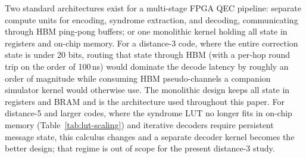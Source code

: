 Two standard architectures exist for a multi-stage FPGA QEC pipeline: separate compute units for encoding, syndrome extraction, and decoding, communicating through HBM ping-pong buffers; or one monolithic kernel holding all state in registers and on-chip memory. For a distance-3 code, where the entire correction state is under 20 bits, routing that state through HBM (with a per-hop round trip on the order of 100\,ns) would dominate the decode latency by roughly an order of magnitude while consuming HBM pseudo-channels a companion simulator kernel would otherwise use. The monolithic design keeps all state in registers and BRAM and is the architecture used throughout this paper. For distance-5 and larger codes, where the syndrome LUT no longer fits in on-chip memory (Table~\ref{tab:lut-scaling}) and iterative decoders require persistent message state, this calculus changes and a separate decoder kernel becomes the better design; that regime is out of scope for the present distance-3 study.

